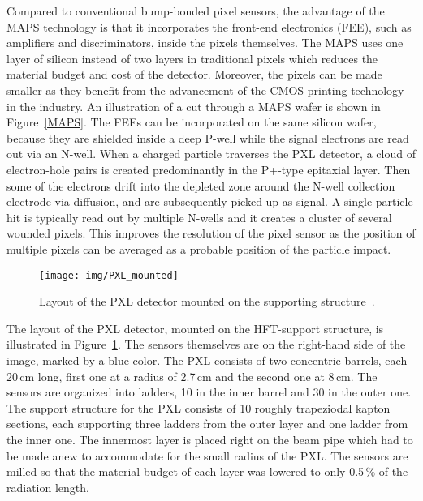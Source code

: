 Compared to conventional bump-bonded pixel sensors, the advantage of the MAPS technology is that it incorporates the front-end electronics (FEE), such as amplifiers and discriminators, inside the pixels themselves. The MAPS uses one layer of silicon instead of two layers in traditional pixels which reduces the material budget and cost of the detector. Moreover, the pixels can be made smaller as they benefit from the advancement of the CMOS-printing technology in the industry. An illustration of a cut through a MAPS wafer is shown in Figure~\ref{MAPS}\@. The FEEs can be incorporated on the same silicon wafer, because they are shielded inside a deep P-well while the signal electrons are read out via an N-well. When a charged particle traverses the PXL detector, a cloud of electron-hole pairs is created predominantly in the P+-type epitaxial layer. Then some of the electrons drift into the depleted zone around the N-well collection electrode via diffusion, and are subsequently picked up as signal. A single-particle hit is typically read out by multiple N-wells and it creates a cluster of several wounded pixels. This improves the resolution of the pixel sensor as the position of multiple pixels can be averaged as a probable position of the particle impact.

\begin{figure}[!htb]
\begin{center}
 \texttt{[image: img/PXL\_mounted]}\\
\end{center}
\caption[Layout of the PXL detector.]{\label{PXL}Layout of the PXL detector mounted on the supporting structure~\cite{HftTdr}.}
\end{figure}

The layout of the PXL detector, mounted on the HFT-support structure, is illustrated in Figure~\ref{PXL}\@. The sensors themselves are on the right-hand side of the image, marked by a blue color. The PXL consists of two concentric barrels, each 20$\,$cm long, first one at a radius of 2.7$\,$cm and the second one at 8$\,$cm.  The sensors are organized into ladders, 10 in the inner barrel and 30 in the outer one. The support structure for the PXL consists of 10 roughly trapeziodal kapton sections, each supporting three ladders from the outer layer and one ladder from the inner one. The innermost layer is placed right on the beam pipe which had to be made anew to accommodate for the small radius of the PXL\@. The sensors are milled so that the material budget of each layer was lowered to only 0.5$\,\%$ of the radiation length.

